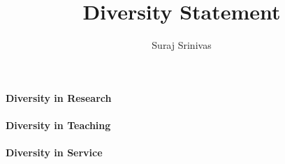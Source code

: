 \documentclass{article}
\title{Diversity Statement}
\author{Suraj Srinivas}
\date{}
\begin{document}
\pagecolor{floralwhite}

\maketitle

\paragraph{Diversity in Research}

\paragraph{Diversity in Teaching}

\paragraph{Diversity in Service}
\end{document}
